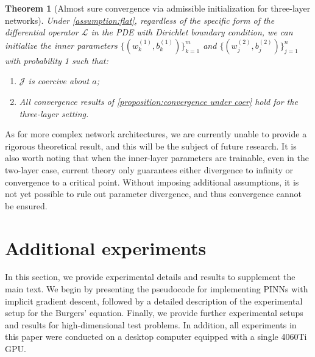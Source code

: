 \documentclass{article}
\newtheorem{theorem}{Theorem}
\begin{document}
\begin{theorem}[Almost sure convergence via admissible initialization for three-layer networks]\label{theorem:3layer_convergence_under_flat}
Under \cref{assumption:flat}, regardless of the specific form of the differential operator $\mathcal{L}$ in the PDE with Dirichlet boundary condition, we can initialize the inner parameters 
\(\{(w_k^{(1)}, b_k^{(1)})\}_{k=1}^{m}\) 
and 
\(\{(w_j^{(2)}, b_j^{(2)})\}_{j=1}^{n}\) 
with probability 1 such that:

\begin{enumerate}
    \item[(i)]  $\mathcal{J}$ is coercive about $a$;
    \item[(ii)] All convergence results of \cref{proposition:convergence under coer} hold for the three-layer setting.
\end{enumerate}
\end{theorem}

As for more complex network architectures, we are currently unable to provide a rigorous theoretical result, and this will be the subject of future research. 
It is also worth noting that when the inner-layer parameters are trainable, even in the two-layer case, current theory only guarantees either divergence to infinity or convergence to a critical point. 
Without imposing additional assumptions, it is not yet possible to rule out parameter divergence, and thus convergence cannot be ensured.

\section{Additional experiments}\label{sec:additional experiments}
In this section, we provide experimental details and results to supplement the main text. 
We begin by presenting the pseudocode for implementing PINNs with implicit gradient descent, followed by a detailed description of the experimental setup for the Burgers' equation. 
Finally, we provide further experimental setups and results for high-dimensional test problems.
In addition, all experiments in this paper were conducted on a desktop computer equipped with a single 4060Ti GPU.
\end{document}
